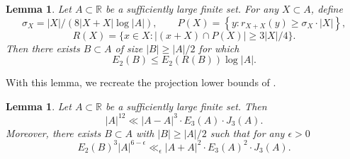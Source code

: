 \documentclass{amsart}
\numberwithin{equation}{section}
\newtheorem{lemma}[theorem]{Lemma}
\newcommand{\e}{\epsilon}
\begin{document}
\begin{lemma}
    \label{lem:rudnev-stevens-input}
    Let \(A \subset \mathbb{R} \) be a sufficiently large finite set. 
    For any \(X \subset A\), define
    \[
    \sigma_X = |X| / (8 |X+X| \log|A|) , \qquad P(X) = \left\{ y  : r_{X+X} (y) \geq \sigma _X \cdot |X| \right\}, 
    \]
    \[
    R(X) = \{x \in X : \left\lvert (x + X)\cap P(X) \right\rvert \geq 3 |X| /4  \}
    .\]
    Then there exists \(B \subset A \) of size \(\left\lvert B \right\rvert \geq \left\lvert A \right\rvert  / 2\) for which
    \[
    E_2(B) \leq E_2(R(B)) \log \left\lvert A \right\rvert 
    .\]
\end{lemma}

With this lemma, we recreate the projection lower bounds of \cite{Cushman-sumproduct}.

\begin{lemma}\label{lem:projection-estimate}
    Let \(A \subset \mathbb{R} \) be a sufficiently large finite set. Then
    \[
    \left\lvert A \right\rvert ^{12} \ll \left\lvert A-A \right\rvert ^{3}  \cdot E_3(A) \cdot  J_3(A)
    .\]
    Moreover, there exists \(B \subset A\) with \(\left\lvert B \right\rvert \geq \left\lvert A \right\rvert / 2\) such that for any \(\e > 0\)
    \[
    E_2(B) ^{3} \left\lvert A \right\rvert ^{6 - \e} \ll _{\e} \left\lvert A+A \right\rvert ^{2} \cdot E_3(A) ^{2} \cdot J_3(A)
    .\]
\end{lemma}
\end{document}

